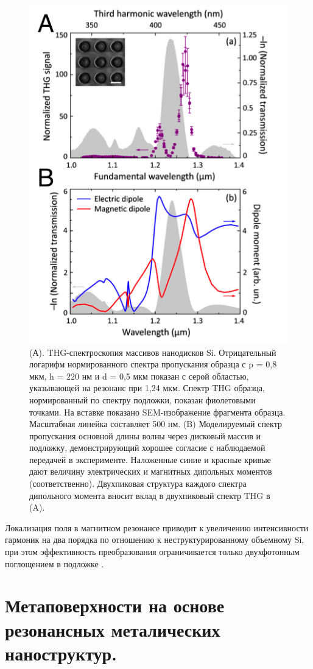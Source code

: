  \begin{figure}
	\centering
	\includegraphics[width=0.5\linewidth]{images/fig3.png}
	\caption{(А). THG-спектроскопия массивов нанодисков Si. Отрицательный логарифм нормированного спектра пропускания образца с p = 0,8 мкм, h = 220 нм и d = 0,5 мкм показан с серой областью, указывающей на резонанс при 1,24 мкм. Спектр THG образца, нормированный по спектру подложки, показан фиолетовыми точками. На вставке показано SEM-изображение фрагмента образца. Масштабная линейка составляет 500 нм. (B) Моделируемый спектр пропускания основной длины волны через дисковый массив и подложку, демонстрирующий хорошее согласие с наблюдаемой передачей в эксперименте. Наложенные синие и красные кривые дают величину электрических и магнитных дипольных моментов (соответственно). Двухпиковая структура каждого спектра дипольного момента вносит вклад в двухпиковый спектр THG в (A).}
	\label{nonliner:nanodisks}
\end{figure}
\hspace*{2mm}Локализация поля в магнитном резонансе приводит к увеличению интенсивности гармоник на два порядка по отношению к неструктурированному объемному Si, при этом эффективность преобразования ограничивается только двухфотонным поглощением в подложке \cite{enhTHGnano}. 

\section{Метаповерхности на основе резонансных металических наноструктур.}

